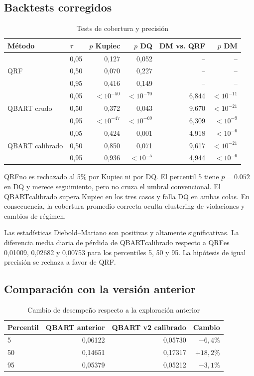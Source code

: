 \documentclass[11pt,a4paper]{article}
\newcommand{\qbart}{\textsc{QBART}}
\newcommand{\qrf}{\textsc{QRF}}
\begin{document}
\subsection{Backtests corregidos}

\begin{table}[H]
\centering
\caption{Tests de cobertura y precisión}
\label{tab:tests}
\small
\begin{tabular}{llrrrr}
\toprule
Método & \(\tau\) & \(p\) Kupiec & \(p\) DQ & DM vs. QRF & \(p\) DM \\
\midrule
\multirow{3}{*}{QRF}
 & 0,05 & 0,127 & 0,052 & -- & -- \\
 & 0,50 & 0,070 & 0,227 & -- & -- \\
 & 0,95 & 0,416 & 0,149 & -- & -- \\
\midrule
\multirow{3}{*}{QBART crudo}
 & 0,05 & \(<10^{-50}\) & \(<10^{-70}\) & 6,844 & \(<10^{-11}\) \\
 & 0,50 & 0,372 & 0,043 & 9,670 & \(<10^{-21}\) \\
 & 0,95 & \(<10^{-47}\) & \(<10^{-69}\) & 6,309 & \(<10^{-9}\) \\
\midrule
\multirow{3}{*}{QBART calibrado}
 & 0,05 & 0,424 & 0,001 & 4,918 & \(<10^{-6}\) \\
 & 0,50 & 0,850 & 0,071 & 9,617 & \(<10^{-21}\) \\
 & 0,95 & 0,936 & \(<10^{-5}\) & 4,944 & \(<10^{-6}\) \\
\bottomrule
\end{tabular}
\end{table}

\qrf no es rechazado al 5\% por Kupiec ni por DQ. El percentil 5 tiene
\(p=0.052\) en DQ y merece seguimiento, pero no cruza el umbral convencional.
El \qbart calibrado supera Kupiec en los tres casos y falla DQ en ambas
colas. En consecuencia, la cobertura promedio correcta oculta clustering de
violaciones y cambios de régimen.

Las estadísticas Diebold--Mariano son positivas y altamente significativas.
La diferencia media diaria de pérdida de \qbart calibrado respecto a \qrf es
0,01009, 0,02682 y 0,00753 para los percentiles 5, 50 y 95. La hipótesis de
igual precisión se rechaza a favor de \qrf.

\subsection{Comparación con la versión anterior}

\begin{table}[H]
\centering
\caption{Cambio de desempeño respecto a la exploración anterior}
\label{tab:old-new}
\begin{tabular}{lrrr}
\toprule
Percentil & QBART anterior & QBART v2 calibrado & Cambio \\
\midrule
5  & 0,06122 & 0,05730 & \(-6,4\%\) \\
50 & 0,14651 & 0,17317 & \(+18,2\%\) \\
95 & 0,05379 & 0,05212 & \(-3,1\%\) \\
\bottomrule
\end{tabular}
\end{table}
\end{document}
